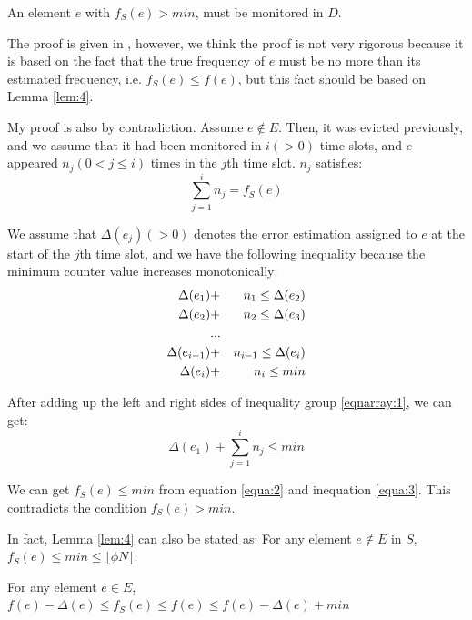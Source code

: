 \documentclass[conference]{IEEEtran}
\begin{document}
\begin{lemma}\label{lem:4}
	An element $e$ with $f_S(e)> min$, must be monitored in $D$.
\end{lemma}

\begin{IEEEproof}
The proof is given in \cite{IEEEexample:spacesaving}, however, we think the proof is not very rigorous because it is based on the fact that the true frequency of $e$ must be no more than its estimated frequency, i.e. $f_S(e)\leq f(e)$, but this fact should be based on Lemma \ref{lem:4}.\par
My proof is also by contradiction. Assume $e\notin E$. Then, it was evicted previously, and we assume that it had been monitored in $i(>0)$ time slots, and $e$ appeared $n_j(0<j\leq i)$ times in the $j$th time slot. $n_j$ satisfies:
\begin{equation}\label{equa:2}
\sum_{j=1}^{i}n_j=f_S(e)
\end{equation}\par
We assume that $\Delta(e_j)(>0)$ denotes the error estimation assigned to $e$ at the start of the $j$th time slot, and we have the following inequality because the minimum counter value increases monotonically:
\setlength{\arraycolsep}{0.0em}
\begin{eqnarray}\label{eqnarray:1}
\Delta(e_1)&+&n_1\leq\Delta(e_2)\notag\\
\Delta(e_2)&+&n_2\leq\Delta(e_3)\notag\\
&...&\\
\Delta(e_{i-1})&+&n_{i-1}\leq\Delta(e_i)\notag\\
\Delta(e_i)&+&n_i\leq min \notag
\end{eqnarray}\par
\setlength{\arraycolsep}{5pt}
After adding up the left and right sides of inequality group \ref{eqnarray:1}, we can get:
\begin{equation}\label{equa:3}
\Delta(e_1)+\sum_{j=1}^{i}n_j\leq min
\end{equation}\par
We can get $f_S(e)\leq min$ from equation \ref{equa:2} and inequation \ref{equa:3}. This contradicts the condition $f_S(e)>min$.\par
In fact, Lemma \ref{lem:4} can also be stated as: For any element $e\notin E$ in $S$, $f_S(e)\leq min\leq \lfloor\phi N\rfloor$.  
\end{IEEEproof}

\begin{lemma}\label{lem:5}
  For any element $e\in E$, $f(e)-\Delta(e)\leq f_S(e)\leq f(e)\leq f(e)-\Delta(e)+min$
\end{lemma}
\end{document}
